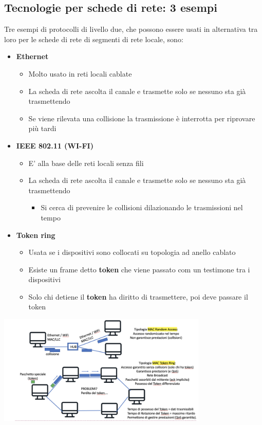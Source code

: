 \documentclass{article}
\begin{document}
\subsection{Tecnologie per schede di rete: 3 esempi}
Tre esempi di protocolli di livello due, che possono essere usati in alternativa tra loro per le schede di rete di segmenti di rete locale, sono:
\begin{itemize}
    \item \textbf{Ethernet}
    \begin{itemize}
        \item Molto usato in reti locali cablate
        \item La scheda di rete ascolta il canale e trasmette solo se nessuno sta già trasmettendo
        \item Se viene rilevata una collisione la trasmissione è interrotta per riprovare più tardi
    \end{itemize}
    \item \textbf{IEEE 802.11 (WI-FI)}
    \begin{itemize}
        \item E' alla base delle reti locali senza fili
        \item La scheda di rete ascolta il canale e trasmette solo se nessuno sta già trasmettendo
        \begin{itemize}
            \item Si cerca di prevenire le collisioni dilazionando le trasmissioni nel tempo
        \end{itemize}
    \end{itemize}
    \item \textbf{Token ring}
    \begin{itemize}
        \item Usata se i dispositivi sono collocati su topologia ad anello cablato
        \item Esiste un frame detto \textbf{token} che viene passato com un testimone tra i dispositivi
        \item Solo chi detiene il \textbf{token} ha diritto di trasmettere, poi deve passare il token
    \end{itemize}
\end{itemize}

\begin{center}
    \includegraphics[width=10cm]{img/esrete.png}
\end{center}
\end{document}
